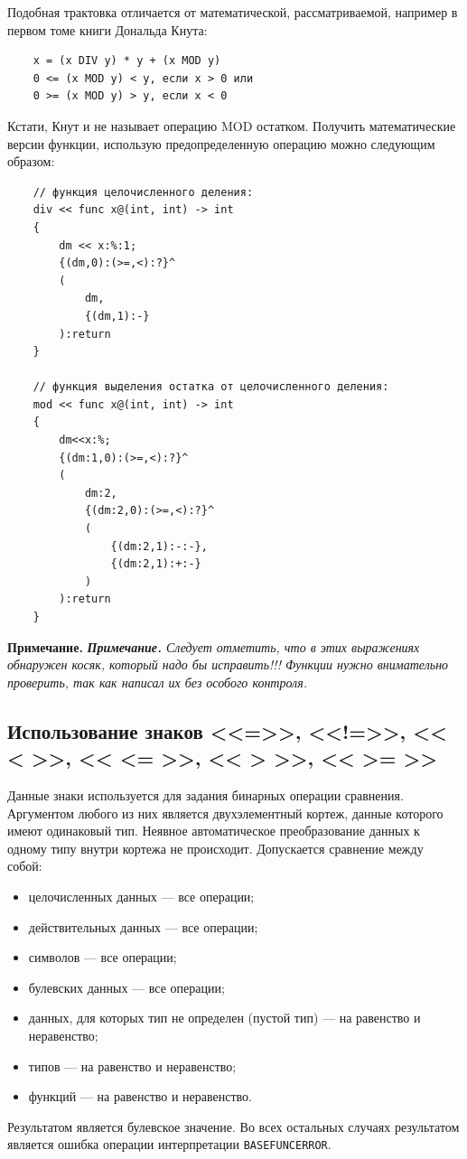 Подобная трактовка отличается от математической, рассматриваемой, например в первом томе книги Дональда Кнута:
\begin{verbatim}
    x = (x DIV y) * y + (x MOD y)
    0 <= (x MOD y) < y, если x > 0 или
    0 >= (x MOD y) > y, если x < 0
\end{verbatim}
Кстати, Кнут и не называет операцию MOD остатком. Получить математические версии функции, использую предопределенную операцию можно следующим образом:
\begin{verbatim}
    // функция целочисленного деления:
    div << func x@(int, int) -> int
    {
        dm << x:%:1;
        {(dm,0):(>=,<):?}^
        (
            dm,
            {(dm,1):-}
        ):return
    }

    // функция выделения остатка от целочисленного деления:
    mod << func x@(int, int) -> int
    {
        dm<<x:%;
        {(dm:1,0):(>=,<):?}^
        (
            dm:2,
            {(dm:2,0):(>=,<):?}^
            (
                {(dm:2,1):-:-},
                {(dm:2,1):+:-}
            )
        ):return
    }
\end{verbatim}


\textbf{Примечание.}
\textit{\textbf{Примечание.}
Следует отметить, что в этих выражениях обнаружен косяк, который надо бы исправить!!!
Функции нужно внимательно проверить, так как написал их без особого контроля.}


\subsection{Использование знаков <<=>>, <<!=>>, << < >>, << <= >>, << > >>, << >= >>}

Данные знаки используется для задания бинарных операции сравнения. Аргументом любого из них является двухэлементный кортеж, данные которого имеют одинаковый тип. Неявное автоматическое преобразование данных к одному типу внутри кортежа не происходит. Допускается сравнение между собой:
\begin{itemize}
    \item целочисленных данных --- все операции;
    \item действительных данных --- все операции;
    \item символов --- все операции;
    \item булевских данных --- все операции;
    \item данных, для которых тип не определен (пустой тип) --- на равенство и неравенство;
    \item типов --- на равенство и неравенство;
    \item функций --- на равенство и неравенство.
\end{itemize}
Результатом является булевское значение.
Во всех остальных случаях результатом является ошибка операции интерпретации \verb|BASEFUNCERROR|.

